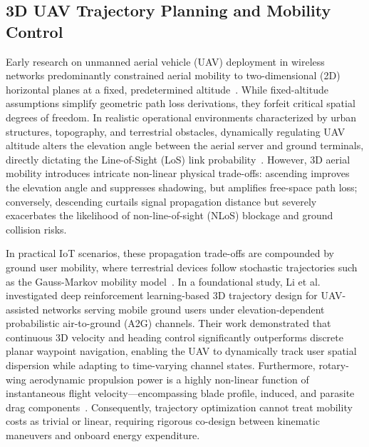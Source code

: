 \documentclass[journal]{IEEEtran}
\begin{document}
\subsection{3D UAV Trajectory Planning and Mobility Control}

Early research on unmanned aerial vehicle (UAV) deployment in wireless networks predominantly constrained aerial mobility to two-dimensional (2D) horizontal planes at a fixed, predetermined altitude~\cite{11500527, 8937764}. While fixed-altitude assumptions simplify geometric path loss derivations, they forfeit critical spatial degrees of freedom. In realistic operational environments characterized by urban structures, topography, and terrestrial obstacles, dynamically regulating UAV altitude alters the elevation angle between the aerial server and ground terminals, directly dictating the Line-of-Sight (LoS) link probability~\cite{li2026tnse}. However, 3D aerial mobility introduces intricate non-linear physical trade-offs: ascending improves the elevation angle and suppresses shadowing, but amplifies free-space path loss; conversely, descending curtails signal propagation distance but severely exacerbates the likelihood of non-line-of-sight (NLoS) blockage and ground collision risks.

In practical IoT scenarios, these propagation trade-offs are compounded by ground user mobility, where terrestrial devices follow stochastic trajectories such as the Gauss-Markov mobility model~\cite{11395508}. In a foundational study, Li et al.~\cite{li2026tnse} investigated deep reinforcement learning-based 3D trajectory design for UAV-assisted networks serving mobile ground users under elevation-dependent probabilistic air-to-ground (A2G) channels. Their work demonstrated that continuous 3D velocity and heading control significantly outperforms discrete planar waypoint navigation, enabling the UAV to dynamically track user spatial dispersion while adapting to time-varying channel states. Furthermore, rotary-wing aerodynamic propulsion power is a highly non-linear function of instantaneous flight velocity---encompassing blade profile, induced, and parasite drag components~\cite{8937764, li2026tnse}. Consequently, trajectory optimization cannot treat mobility costs as trivial or linear, requiring rigorous co-design between kinematic maneuvers and onboard energy expenditure.
\end{document}

